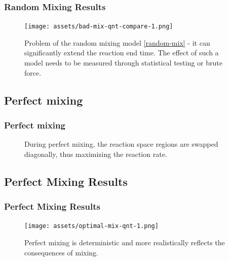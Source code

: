 \documentclass{beamer}
\begin{document}
\begin{frame}
  \frametitle{Random Mixing Results}
  \begin{figure}
    \centering
    \texttt{[image: assets/bad-mix-qnt-compare-1.png]}
    \caption{Problem of the random mixing model \eqref{random-mix} - it can significantly extend the reaction end time. The effect of such a model needs to be measured through statistical testing or brute force.}
  \end{figure}
\end{frame}

\subsection{Perfect mixing}
\begin{frame}
\frametitle{Perfect mixing}
\begin{figure}
\centering
{}
\caption{During perfect mixing, the reaction space regions are swapped diagonally, thus maximizing the reaction rate.}
\label{perfect-mix}
\end{figure}
\end{frame}

\subsection{Perfect Mixing Results}
\begin{frame}
\frametitle{Perfect Mixing Results}
\begin{figure}
\centering
\texttt{[image: assets/optimal-mix-qnt-1.png]}
\caption{Perfect mixing is deterministic and more realistically reflects the consequences of mixing.}
\end{figure}
\end{frame}
\end{document}
